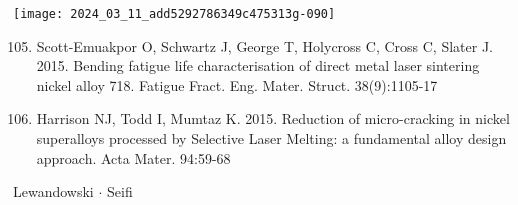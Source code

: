 \documentclass[10pt]{article}
\begin{document}
\begin{center}
\texttt{[image: 2024\_03\_11\_add5292786349c475313g-090]}
\end{center}

\begin{enumerate}
  \setcounter{enumi}{104}
  \item Scott-Emuakpor O, Schwartz J, George T, Holycross C, Cross C, Slater J. 2015. Bending fatigue life characterisation of direct metal laser sintering nickel alloy 718. Fatigue Fract. Eng. Mater. Struct. 38(9):1105-17

  \item Harrison NJ, Todd I, Mumtaz K. 2015. Reduction of micro-cracking in nickel superalloys processed by Selective Laser Melting: a fundamental alloy design approach. Acta Mater. 94:59-68

\end{enumerate}

Lewandowski $\cdot$ Seifi
\end{document}
